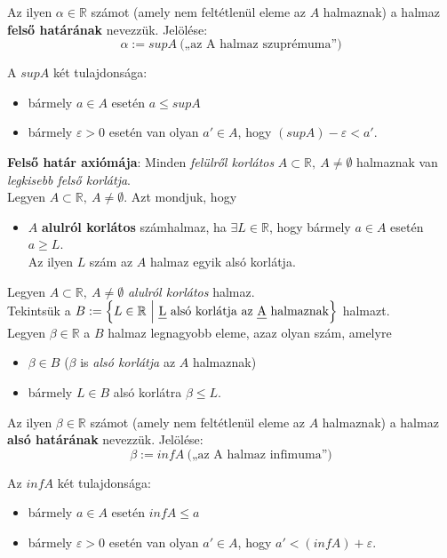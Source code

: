 \documentclass[tikz,12pt,margin=0px]{article}
\begin{document}
{    \noindent Az ilyen $\alpha \in \mathbb{R}$ számot (amely nem feltétlenül eleme az $A$ halmaznak) a halmaz \textbf{felső határának} nevezzük.
    \noindent Jelölése:
    \[
        \alpha := sup A\ \text{(„az A halmaz szuprémuma”)}
    \]

    \noindent A $supA$ két tulajdonsága:
    \begin{itemize}
        \item bármely $a \in A$ esetén $a \leq supA$
        \item bármely $\varepsilon > 0$ esetén van olyan $a' \in A$, hogy $(supA) -\varepsilon < a'$.\\
    \end{itemize}

    \noindent \textbf{Felső határ axiómája}: Minden \emph{felülről korlátos} $A \subset \mathbb{R},\ A \neq \emptyset$ halmaznak van \emph{legkisebb felső korlátja}.\\

    \noindent Legyen $A \subset \mathbb{R},\ A \neq \emptyset$. Azt mondjuk, hogy
    \begin{itemize}
        \item $A$ \textbf{alulról korlátos} számhalmaz, ha $\exists L \in \mathbb{R}$, hogy bármely $a \in A$ esetén $a \geq L$.\\ Az ilyen $L$ szám az $A$ halmaz egyik alsó korlátja.\\
    \end{itemize}

    \noindent Legyen $A \subset \mathbb{R},\ A \neq \emptyset$ \emph{alulról korlátos} halmaz. \\
    Tekintsük a $B := \Big\{L \in \mathbb{R}\ \Big|\ \text{\emph{L} alsó korlátja az \emph{A} halmaznak}\Big\}$ halmazt.\\
    Legyen $\beta \in \mathbb{R}$ a $B$ halmaz legnagyobb eleme, azaz olyan szám, amelyre
    \begin{itemize}
        \item $\beta \in B$ ($\beta$ is \emph{alsó korlátja} az $A$ halmaznak)
        \item bármely $L \in B$ alsó korlátra $\beta \leq L$.
    \end{itemize}

    \noindent Az ilyen $\beta \in \mathbb{R}$ számot (amely nem feltétlenül eleme az $A$ halmaznak) a halmaz \textbf{alsó határának} nevezzük.
    Jelölése:
    \[
        \beta := inf A\ \text{(„az A halmaz infimuma”)}
    \]

    \noindent Az $infA$ két tulajdonsága:
    \begin{itemize}
        \item bármely $a \in A$ esetén $infA \leq a$
        \item bármely $\varepsilon > 0$ esetén van olyan $a' \in A$, hogy $a' < (infA) +\varepsilon$.
    \end{itemize}

    }
\end{document}
